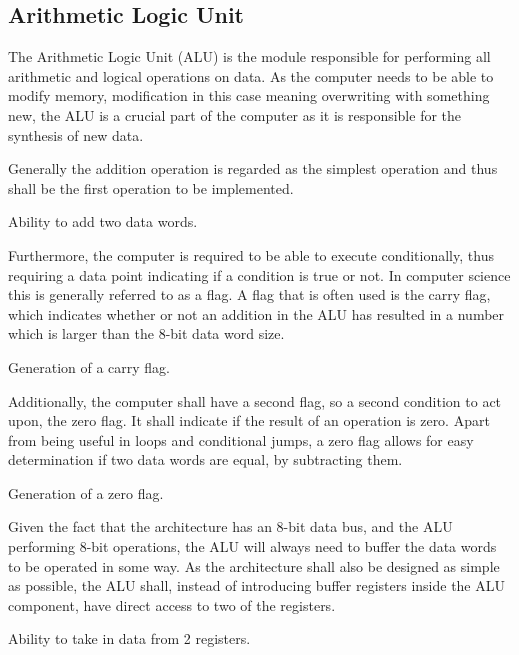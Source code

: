 \subsection{Arithmetic Logic Unit}
The Arithmetic Logic Unit (ALU) is the module responsible for performing all arithmetic and logical operations on data. \cite{vonneuman1945a}
As the computer needs to be able to modify memory, modification in this case meaning overwriting with something new, the ALU is a crucial part of the computer as it is responsible for the synthesis of new data.

Generally the addition operation is regarded as the simplest operation and thus shall be the first operation to be implemented.

\begin{turing-requirement}
  Ability to add two data words.
\end{turing-requirement}

Furthermore, the computer is required to be able to execute conditionally, thus requiring a data point indicating if a condition is true or not. In computer science this is generally referred to as a flag. A flag that is often used is the carry flag, which indicates whether or not an addition in the ALU has resulted in a number which is larger than the 8-bit data word size.


\begin{turing-requirement}
  Generation of a carry flag. 
\end{turing-requirement}

Additionally, the computer shall have a second flag, so a second condition to act upon, the zero flag. It shall indicate if the result of an operation is zero. Apart from being useful in loops and conditional jumps, a zero flag allows for easy determination if two data words are equal, by subtracting them. 
\begin{feat-requirement}
  Generation of a zero flag.
\end{feat-requirement}

Given the fact that the architecture has an 8-bit data bus, and the ALU performing 8-bit operations, the ALU will always need to buffer the data words to be operated in some way. As the architecture shall also be designed as simple as possible, the ALU shall, instead of introducing buffer registers inside the ALU component, have direct access to two of the registers.
\begin{arch-requirement}
  Ability to take in data from 2 registers.
\end{arch-requirement}

